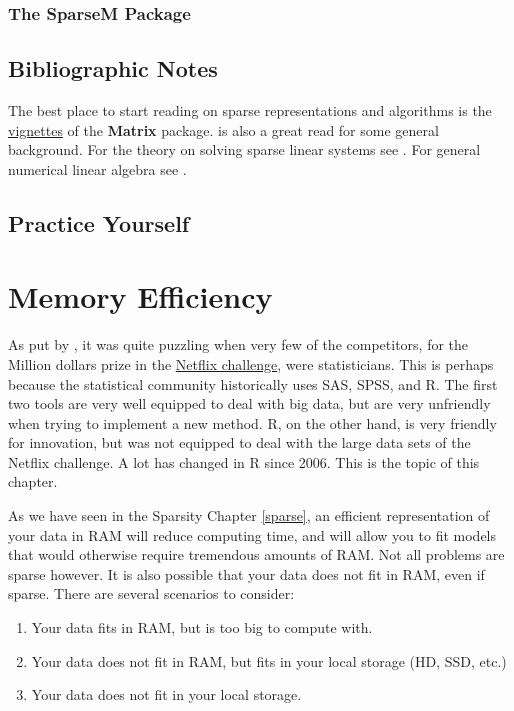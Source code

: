 \documentclass[]{book}
\providecommand{\tightlist}{%
  \setlength{\itemsep}{0pt}\setlength{\parskip}{0pt}}
\theoremstyle{definition}
\theoremstyle{definition}
\theoremstyle{definition}
\theoremstyle{remark}
\begin{document}
\subsection{The SparseM Package}\label{the-sparsem-package}

\section{Bibliographic Notes}\label{bibliographic-notes-10}

The best place to start reading on sparse representations and algorithms
is the
\href{http://svitsrv25.epfl.ch/R-doc/library/Matrix/doc/}{vignettes} of
the \textbf{Matrix} package. \citet{gilbert1992sparse} is also a great
read for some general background. For the theory on solving sparse
linear systems see \citet{davis2006direct}. For general numerical linear
algebra see \citet{gentle2012numerical}.

\section{Practice Yourself}\label{practice-yourself-11}

\chapter{Memory Efficiency}\label{memory}

As put by \citet{kane2013scalable}, it was quite puzzling when very few
of the competitors, for the Million dollars prize in the
\href{https://en.wikipedia.org/wiki/Netflix_Prize}{Netflix challenge},
were statisticians. This is perhaps because the statistical community
historically uses SAS, SPSS, and R. The first two tools are very well
equipped to deal with big data, but are very unfriendly when trying to
implement a new method. R, on the other hand, is very friendly for
innovation, but was not equipped to deal with the large data sets of the
Netflix challenge. A lot has changed in R since 2006. This is the topic
of this chapter.

As we have seen in the Sparsity Chapter \ref{sparse}, an efficient
representation of your data in RAM will reduce computing time, and will
allow you to fit models that would otherwise require tremendous amounts
of RAM. Not all problems are sparse however. It is also possible that
your data does not fit in RAM, even if sparse. There are several
scenarios to consider:

\begin{enumerate}
\def\labelenumi{\arabic{enumi}.}
\tightlist
\item
  Your data fits in RAM, but is too big to compute with.
\item
  Your data does not fit in RAM, but fits in your local storage (HD,
  SSD, etc.)
\item
  Your data does not fit in your local storage.
\end{enumerate}
\end{document}
